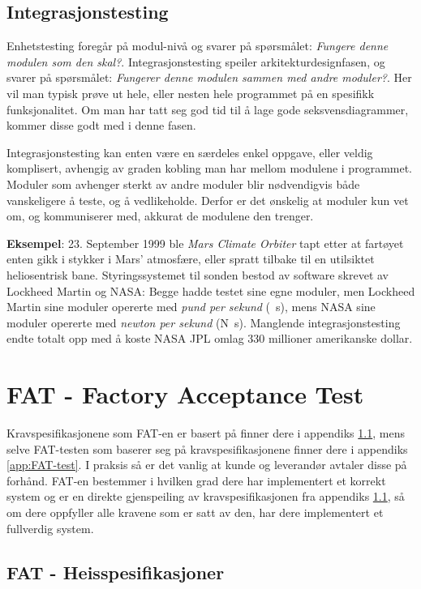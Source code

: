 \subsection{Integrasjonstesting}

Enhetstesting foregår på modul-nivå og svarer på spørsmålet: \textit{Fungere denne modulen som den skal?}. Integrasjonstesting speiler arkitekturdesignfasen, og svarer på spørsmålet: \textit{Fungerer denne modulen sammen med andre moduler?}. Her vil man typisk prøve ut hele, eller nesten hele programmet på en spesifikk funksjonalitet. Om man har tatt seg god tid til å lage gode seksvensdiagrammer, kommer disse godt med i denne fasen.

Integrasjonstesting kan enten være en særdeles enkel oppgave, eller veldig komplisert, avhengig av graden kobling man har mellom modulene i programmet. Moduler som avhenger sterkt av andre moduler blir nødvendigvis både vanskeligere å teste, og å vedlikeholde. Derfor er det ønskelig at moduler kun vet om, og kommuniserer med, akkurat de modulene den trenger.

\textbf{Eksempel}: 23. September 1999 ble \textit{Mars Climate Orbiter} tapt etter at fartøyet enten gikk i stykker i Mars' atmosfære, eller spratt tilbake til en utilsiktet heliosentrisk bane. Styringssystemet til sonden bestod av software skrevet av Lockheed Martin og NASA: Begge hadde testet sine egne moduler, men Lockheed Martin sine moduler opererte med \textit{pund per sekund} (\si{\pound\s}), mens NASA sine moduler opererte med \textit{newton per sekund} (\si{\N\s}). Manglende integrasjonstesting endte totalt opp med å koste NASA JPL omlag 330 millioner amerikanske dollar.


\section{FAT - Factory Acceptance Test}\label{subsec:FAT}

Kravspesifikasjonene som FAT-en er basert på finner dere i appendiks \ref{app:FATkrav}, mens selve FAT-testen som baserer seg på kravspesifikasjonene finner dere i appendiks \ref{app:FAT-test}. I praksis så er det vanlig at kunde og leverandør avtaler disse på forhånd. FAT-en bestemmer i hvilken grad dere har implementert et korrekt system og er en direkte gjenspeiling av kravspesifikasjonen fra appendiks \ref{app:FATkrav}, så om dere oppfyller alle kravene som er satt av den, har dere implementert et fullverdig system.


\subsection{FAT - Heisspesifikasjoner}\label{app:FATkrav}


